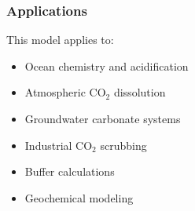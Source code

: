 \documentclass{beamer}
\begin{document}
\begin{frame}
\frametitle{Applications}
This model applies to:
\begin{itemize}
\item Ocean chemistry and acidification
\item Atmospheric CO$_2$ dissolution
\item Groundwater carbonate systems
\item Industrial CO$_2$ scrubbing
\item Buffer calculations
\item Geochemical modeling
\end{itemize}
\end{frame}
\end{document}
